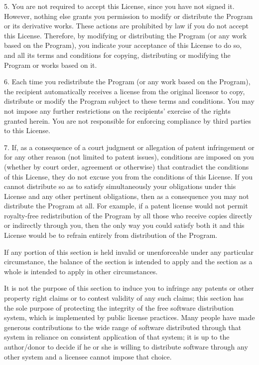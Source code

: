 5. You are not required to accept this License, since you have not
signed it.  However, nothing else grants you permission to modify or
distribute the Program or its derivative works.  These actions are
prohibited by law if you do not accept this License.  Therefore, by
modifying or distributing the Program (or any work based on the
Program), you indicate your acceptance of this License to do so, and
all its terms and conditions for copying, distributing or modifying
the Program or works based on it.

6. Each time you redistribute the Program (or any work based on the
Program), the recipient automatically receives a license from the
original licensor to copy, distribute or modify the Program subject to
these terms and conditions.  You may not impose any further
restrictions on the recipients' exercise of the rights granted herein.
You are not responsible for enforcing compliance by third parties to
this License.

7. If, as a consequence of a court judgment or allegation of patent
infringement or for any other reason (not limited to patent issues),
conditions are imposed on you (whether by court order, agreement or
otherwise) that contradict the conditions of this License, they do not
excuse you from the conditions of this License.  If you cannot
distribute so as to satisfy simultaneously your obligations under this
License and any other pertinent obligations, then as a consequence you
may not distribute the Program at all.  For example, if a patent
license would not permit royalty-free redistribution of the Program by
all those who receive copies directly or indirectly through you, then
the only way you could satisfy both it and this License would be to
refrain entirely from distribution of the Program.

If any portion of this section is held invalid or unenforceable under
any particular circumstance, the balance of the section is intended to
apply and the section as a whole is intended to apply in other
circumstances.

It is not the purpose of this section to induce you to infringe any
patents or other property right claims or to contest validity of any
such claims; this section has the sole purpose of protecting the
integrity of the free software distribution system, which is
implemented by public license practices.  Many people have made
generous contributions to the wide range of software distributed
through that system in reliance on consistent application of that
system; it is up to the author/donor to decide if he or she is willing
to distribute software through any other system and a licensee cannot
impose that choice.

